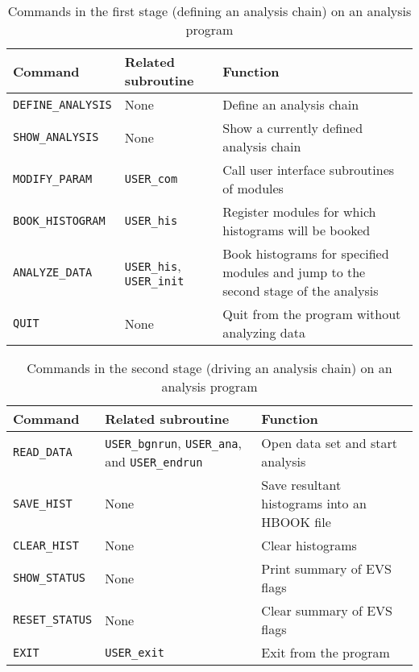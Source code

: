 \begin{table}[hbt]
\begin{center}
\begin{tabular}{|l|l|p{}|}
\hline
Command & Related subroutine & Function \\
\hline
{\tt DEFINE\_ANALYSIS} & None & Define an analysis chain \\
{\tt SHOW\_ANALYSIS}   & None & Show a currently defined analysis chain \\
{\tt MODIFY\_PARAM}    & {\tt USER\_com}
                       & Call user interface subroutines of modules\\
{\tt BOOK\_HISTOGRAM}  & {\tt USER\_his}
                       & Register modules for which histograms will be booked\\
{\tt ANALYZE\_DATA}    & {\tt USER\_his}, {\tt USER\_init}
                       & Book histograms for specified modules
			 and jump to the second stage of the analysis \\
{\tt QUIT}             & None & Quit from the program without analyzing data \\
\hline
\end{tabular}
\caption{Commands in the first stage (defining an analysis chain)
on an analysis program}
\label{tab:command-1}
\end{center}
\end{table}

\begin{table}[hbt]
\begin{center}
\begin{tabular}{|l|p{}|p{}|}
\hline
Command & Related subroutine & Function \\
\hline
{\tt READ\_DATA}    & {\tt USER\_bgnrun}, {\tt USER\_ana},
                      and {\tt USER\_endrun}
                    & Open data set and start analysis \\
{\tt SAVE\_HIST}    & None & Save resultant histograms into an HBOOK file \\
{\tt CLEAR\_HIST}   & None & Clear histograms \\
{\tt SHOW\_STATUS}  & None & Print summary of EVS flags \\
{\tt RESET\_STATUS} & None & Clear summary of EVS flags \\
{\tt EXIT}          & {\tt USER\_exit} & Exit from the program \\
\hline
\end{tabular}
\caption{Commands in the second stage (driving an analysis chain)
on an analysis program}
\label{tab:command-2}
\end{center}
\end{table}

